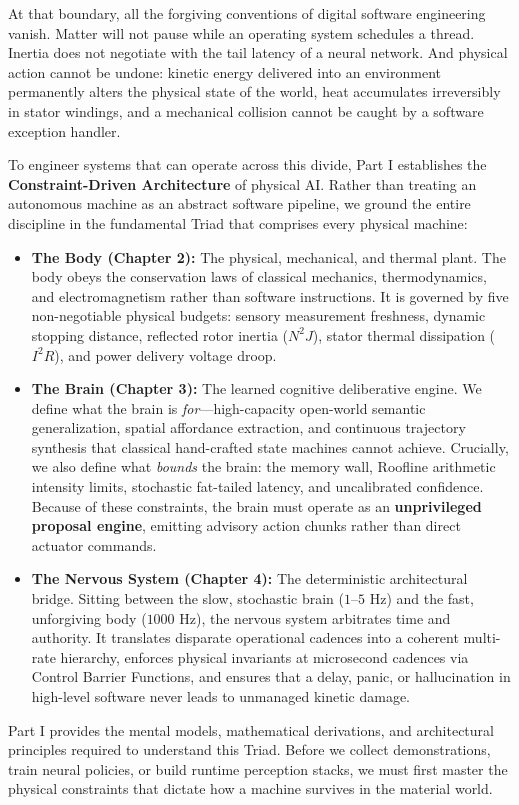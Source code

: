 \documentclass[
  10pt,
  letterpaper,
  twoside,
  openright,
  numbers=noenddot,
  headings=standardclasses
]{scrbook}
\begin{document}
At that boundary, all the forgiving conventions of digital software
engineering vanish. Matter will not pause while an operating system
schedules a thread. Inertia does not negotiate with the tail latency of
a neural network. And physical action cannot be undone: kinetic energy
delivered into an environment permanently alters the physical state of
the world, heat accumulates irreversibly in stator windings, and a
mechanical collision cannot be caught by a software exception handler.

To engineer systems that can operate across this divide, Part I
establishes the \textbf{Constraint-Driven Architecture} of physical AI.
Rather than treating an autonomous machine as an abstract software
pipeline, we ground the entire discipline in the fundamental Triad that
comprises every physical machine:

\begin{itemize}
\tightlist
\item
  \textbf{The Body (Chapter 2):} The physical, mechanical, and thermal
  plant. The body obeys the conservation laws of classical mechanics,
  thermodynamics, and electromagnetism rather than software
  instructions. It is governed by five non-negotiable physical budgets:
  sensory measurement freshness, dynamic stopping distance, reflected
  rotor inertia (\(N^2 J\)), stator thermal dissipation (\(I^2 R\)), and
  power delivery voltage droop.
\item
  \textbf{The Brain (Chapter 3):} The learned cognitive deliberative
  engine. We define what the brain is \emph{for}---high-capacity
  open-world semantic generalization, spatial affordance extraction, and
  continuous trajectory synthesis that classical hand-crafted state
  machines cannot achieve. Crucially, we also define what \emph{bounds}
  the brain: the memory wall, Roofline arithmetic intensity limits,
  stochastic fat-tailed latency, and uncalibrated confidence. Because of
  these constraints, the brain must operate as an \textbf{unprivileged
  proposal engine}, emitting advisory action chunks rather than direct
  actuator commands.
\item
  \textbf{The Nervous System (Chapter 4):} The deterministic
  architectural bridge. Sitting between the slow, stochastic brain
  (\(1\text{--}5\text{ Hz}\)) and the fast, unforgiving body
  (\(1000\text{ Hz}\)), the nervous system arbitrates time and
  authority. It translates disparate operational cadences into a
  coherent multi-rate hierarchy, enforces physical invariants at
  microsecond cadences via Control Barrier Functions, and ensures that a
  delay, panic, or hallucination in high-level software never leads to
  unmanaged kinetic damage.
\end{itemize}

Part I provides the mental models, mathematical derivations, and
architectural principles required to understand this Triad. Before we
collect demonstrations, train neural policies, or build runtime
perception stacks, we must first master the physical constraints that
dictate how a machine survives in the material world.
\end{document}

